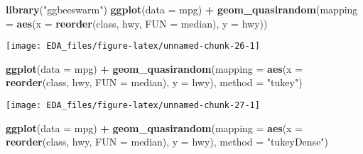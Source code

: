 \documentclass[]{book}
\newenvironment{Shaded}{\begin{snugshade}}{\end{snugshade}}
\newcommand{\DataTypeTok}[1]{\textcolor[rgb]{0.13,0.29,0.53}{#1}}
\newcommand{\KeywordTok}[1]{\textcolor[rgb]{0.13,0.29,0.53}{\textbf{#1}}}
\newcommand{\NormalTok}[1]{#1}
\newcommand{\OperatorTok}[1]{\textcolor[rgb]{0.81,0.36,0.00}{\textbf{#1}}}
\newcommand{\StringTok}[1]{\textcolor[rgb]{0.31,0.60,0.02}{#1}}
\theoremstyle{plain}
\theoremstyle{remark}
\begin{document}
\begin{Shaded}
\begin{Highlighting}[]
\KeywordTok{library}\NormalTok{(}\StringTok{"ggbeeswarm"}\NormalTok{)}
\KeywordTok{ggplot}\NormalTok{(}\DataTypeTok{data =}\NormalTok{ mpg) }\OperatorTok{+}
\StringTok{  }\KeywordTok{geom_quasirandom}\NormalTok{(}\DataTypeTok{mapping =} \KeywordTok{aes}\NormalTok{(}\DataTypeTok{x =} \KeywordTok{reorder}\NormalTok{(class, hwy, }\DataTypeTok{FUN =}\NormalTok{ median),}
                                 \DataTypeTok{y =}\NormalTok{ hwy))}
\end{Highlighting}
\end{Shaded}

\begin{center}\texttt{[image: EDA\_files/figure-latex/unnamed-chunk-26-1]} \end{center}

\begin{Shaded}
\begin{Highlighting}[]
\KeywordTok{ggplot}\NormalTok{(}\DataTypeTok{data =}\NormalTok{ mpg) }\OperatorTok{+}
\StringTok{  }\KeywordTok{geom_quasirandom}\NormalTok{(}\DataTypeTok{mapping =} \KeywordTok{aes}\NormalTok{(}\DataTypeTok{x =} \KeywordTok{reorder}\NormalTok{(class, hwy, }\DataTypeTok{FUN =}\NormalTok{ median),}
                                 \DataTypeTok{y =}\NormalTok{ hwy),}
                   \DataTypeTok{method =} \StringTok{"tukey"}\NormalTok{)}
\end{Highlighting}
\end{Shaded}

\begin{center}\texttt{[image: EDA\_files/figure-latex/unnamed-chunk-27-1]} \end{center}

\begin{Shaded}
\begin{Highlighting}[]
\KeywordTok{ggplot}\NormalTok{(}\DataTypeTok{data =}\NormalTok{ mpg) }\OperatorTok{+}
\StringTok{  }\KeywordTok{geom_quasirandom}\NormalTok{(}\DataTypeTok{mapping =} \KeywordTok{aes}\NormalTok{(}\DataTypeTok{x =} \KeywordTok{reorder}\NormalTok{(class, hwy, }\DataTypeTok{FUN =}\NormalTok{ median),}
                                 \DataTypeTok{y =}\NormalTok{ hwy),}
                   \DataTypeTok{method =} \StringTok{"tukeyDense"}\NormalTok{)}
\end{Highlighting}
\end{Shaded}
\end{document}
